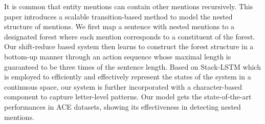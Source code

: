 It is common that entity mentions can contain other mentions recursively. This paper introduces a scalable transition-based method to model the nested structure of mentions. We first map a sentence with nested mentions to a designated forest where each mention corresponds to a constituent of the forest. Our shift-reduce based system then learns to construct the forest structure in a bottom-up manner through an action sequence whose maximal length is guaranteed to be  three times of the sentence length. Based on Stack-LSTM which is employed to efficiently and effectively represent the states of the system in a continuous space, our system is further incorporated with a character-based component to capture letter-level patterns.  Our model gets the state-of-the-art performances in ACE datasets, showing its effectiveness in detecting nested mentions.
